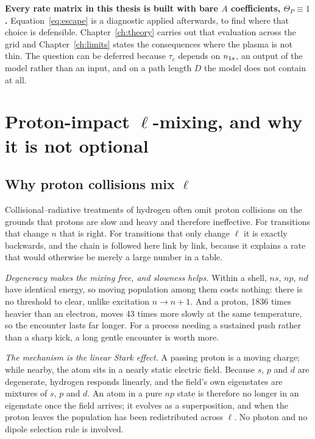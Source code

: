 \textbf{Every rate matrix in this thesis is built with bare $A$ coefficients,
$\Theta_P \equiv 1$.} Equation~\eqref{eq:escape} is a diagnostic applied
afterwards, to find where that choice is defensible. Chapter~\ref{ch:theory}
carries out that evaluation across the grid and Chapter~\ref{ch:limits} states
the consequences where the plasma is not thin. The question can be deferred
because $\tau_c$ depends on $n_{1s}$, an output of the model rather than an input,
and on a path length $D$ the model does not contain at all.

\section{Proton-impact \texorpdfstring{$\ell$}{l}-mixing, and why it is not optional}
\label{sec:lmixing}

\subsection{Why proton collisions mix \texorpdfstring{$\ell$}{l}}

Collisional--radiative treatments of hydrogen often omit proton collisions on
the grounds that protons are slow and heavy and therefore ineffective. For
transitions that change $n$ that is right. For transitions that only change
$\ell$ it is exactly backwards, and the chain is followed here link by link,
because it explains a rate that would otherwise be merely a large number in a
table.

\emph{Degeneracy makes the mixing free, and slowness helps.} Within a shell,
$ns$, $np$, $nd$ have identical energy, so moving population among them costs
nothing: there is no threshold to clear, unlike excitation $n \to n+1$. And a
proton, 1836 times heavier than an electron, moves 43 times more slowly at the
same temperature, so the encounter lasts far longer. For a process needing a
sustained push rather than a sharp kick, a long gentle encounter is worth more.

\emph{The mechanism is the linear Stark effect.} A passing proton is a moving
charge; while nearby, the atom sits in a nearly static electric field. Because
$s$, $p$ and $d$ are degenerate, hydrogen responds linearly, and the field's own
eigenstates are mixtures of $s$, $p$ and $d$. An atom in a pure $np$ state is
therefore no longer in an eigenstate once the field arrives; it evolves as a
superposition, and when the proton leaves the population has been redistributed
across $\ell$. No photon and no dipole selection rule is involved.

